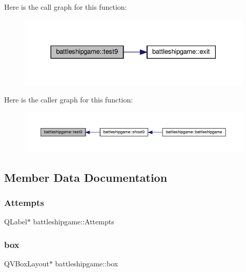 Here is the call graph for this function\+:
\nopagebreak
\begin{figure}[H]
\begin{center}
\leavevmode
\includegraphics[width=330pt]{classbattleshipgame_adcb72d849316cf91db67e2d40cf9757e_cgraph}
\end{center}
\end{figure}
Here is the caller graph for this function\+:
\nopagebreak
\begin{figure}[H]
\begin{center}
\leavevmode
\includegraphics[width=350pt]{classbattleshipgame_adcb72d849316cf91db67e2d40cf9757e_icgraph}
\end{center}
\end{figure}


\subsection{Member Data Documentation}
\mbox{\label{classbattleshipgame_ac313ece1b979ec98cbaf3a62286db252}} 
\subsubsection{\texorpdfstring{Attempts}{Attempts}}
{\footnotesize\ttfamily Q\+Label$\ast$ battleshipgame\+::\+Attempts\hspace{0.3cm}{\ttfamily [private]}}

\mbox{\label{classbattleshipgame_a1a9770308ece4820fd52e04102d8ab2a}} 
\subsubsection{\texorpdfstring{box}{box}}
{\footnotesize\ttfamily Q\+V\+Box\+Layout$\ast$ battleshipgame\+::box\hspace{0.3cm}{\ttfamily [private]}}

